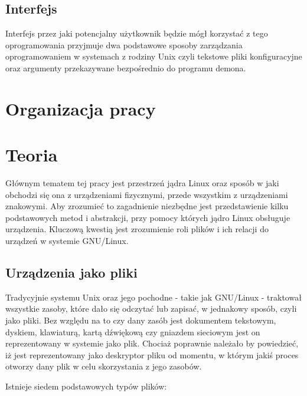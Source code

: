 \documentclass[10pt]{article}
\begin{document}
\subsection{Interfejs}

Interfejs przez jaki potencjalny użytkownik będzie mógł korzystać z tego oprogramowania przyjmuje dwa podstawowe sposoby zarządzania oprogramowaniem w systemach z rodziny Unix czyli tekstowe pliki konfiguracyjne oraz argumenty przekazywane bezpośrednio do programu
demona.

\section{Organizacja pracy}


\section{Teoria}
\label{theory}

Głównym tematem tej pracy jest przestrzeń jądra Linux oraz sposób w jaki obchodzi się ona z urządzeniami fizycznymi, przede wszystkim z urządzeniami znakowymi. Aby zrozumieć to zagadnienie niezbędne jest przedstawienie kilku podstawowych metod i abstrakcji, przy pomocy których jądro Linux obsługuje urządzenia. Kluczową kwestią jest zrozumienie roli plików i ich relacji do urządzeń w systemie GNU/Linux.

\subsection{Urządzenia jako pliki}
\label{devasfiles}

Tradycyjnie systemu Unix oraz jego pochodne - takie jak GNU/Linux - traktował wszystkie zasoby, które dało się odczytać lub zapisać, w jednakowy sposób, czyli jako pliki. Bez względu na to czy dany zasób jest dokumentem tekstowym, dyskiem, klawiaturą, kartą dźwiękową czy gniazdem sieciowym jest on reprezentowany w systemie jako plik. Chociaż poprawnie należało by powiedzieć, iż jest reprezentowany jako deskryptor pliku od momentu, w którym jakiś proces otworzy dany plik w celu skorzystania z jego zasobów.

Istnieje siedem podstawowych typów plików:
\end{document}
